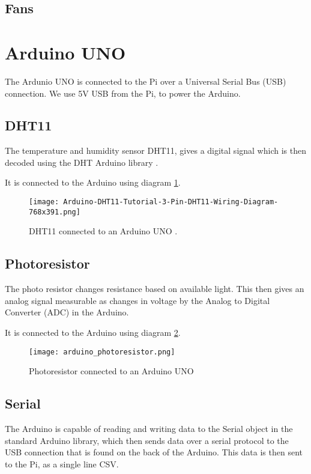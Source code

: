 \documentclass[a4paper,12pt,twoside,openright,titlepage]{book}
\begin{document}
\subsection{Fans}


\section{Arduino UNO}
The Ardunio UNO is connected to the Pi over a Universal Serial Bus (USB) connection.
We use 5V USB from the Pi, to power the Arduino.

\subsection{DHT11}
The temperature and humidity sensor DHT11, gives a digital signal which is then decoded using the DHT Arduino library \cite{dht}.

It is connected to the Arduino using diagram \ref{diagram1}.

\begin{figure}[h]
    \texttt{[image: Arduino-DHT11-Tutorial-3-Pin-DHT11-Wiring-Diagram-768x391.png]}
    \caption{DHT11 connected to an Arduino UNO \cite{dht}.}
    \label{diagram1}
\end{figure}

\subsection{Photoresistor}
The photo resistor changes resistance based on available light.
This then gives an analog signal measurable as changes in voltage by the Analog to Digital Converter (ADC) in the Arduino.

It is connected to the Arduino using diagram \ref{diagram2}.

\begin{figure}[h]
    \texttt{[image: arduino\_photoresistor.png]}
    \caption{Photoresistor connected to an Arduino UNO \cite{photoresistor_arduino}}
    \label{diagram2}
\end{figure}

\subsection{Serial}
The Arduino is capable of reading and writing data to the Serial object in the standard Arduino library, which then sends data over a serial protocol to the USB connection that is found on the back of the Arduino.
This data is then sent to the Pi, as a single line CSV.
\end{document}
